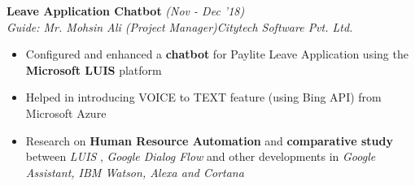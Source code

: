 \documentclass{article}
\begin{document}
  

\vspace{-5pt}
\hspace*{-16pt}\textbf{Leave Application Chatbot} \hfill{\sl \small (Nov - Dec '18)}\\
{\it Guide: Mr. Mohsin Ali (Project Manager)}\hfill{\sl \small Citytech Software Pvt. Ltd.}\\
\vspace{-17pt}
\begin{itemize}[itemsep = -0.75 mm, leftmargin=*]
  \item Configured and enhanced a {\bf chatbot} for Paylite Leave Application using the {\bf Microsoft LUIS} platform 
  \item Helped in introducing VOICE to TEXT feature (using Bing API) from Microsoft Azure
  \item Research on {\bf Human Resource Automation} and {\bf comparative study} between {\it LUIS} , {\it Google Dialog Flow} and other developments in \textit{Google Assistant, IBM Watson, Alexa and Cortana}
\end{itemize}

\vspace{-13pt}
\end{document}
